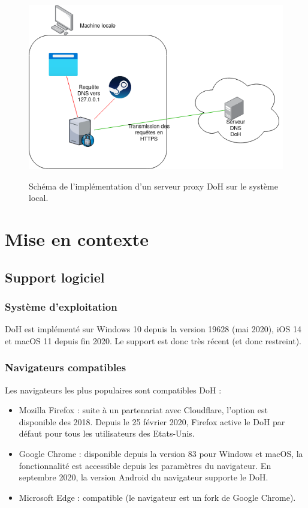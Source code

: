 \documentclass[a4paper,12pt]{article}
\begin{document}
	\begin{figure}[H]
		\begin{center}
			{\includegraphics[scale=0.6]{Images/schema_doh_proxy_local.png}}
		\end{center}
		\caption{Schéma de l'implémentation d'un serveur proxy DoH sur le système local.}
	\end{figure}

	\section{Mise en contexte}
	
	\subsection{Support logiciel}
	
	\subsubsection{Système d'exploitation}
	DoH est implémenté sur Windows 10 depuis la version 19628 (mai 2020), iOS 14 et macOS 11 depuis fin 2020. Le support est donc très récent (et donc restreint).
	\subsubsection{Navigateurs compatibles}
	Les navigateurs les plus populaires sont compatibles DoH :
	\begin{itemize}
		\item Mozilla Firefox : suite à un partenariat avec Cloudflare, l'option est disponible des 2018. Depuis le 25 février 2020, Firefox active le DoH par défaut pour tous les utilisateurs des Etats-Unis.
		\item Google Chrome : disponible depuis la version 83 pour Windows et macOS, la fonctionnalité est accessible depuis les paramètres du navigateur. En septembre 2020, la version Android du navigateur supporte le DoH.
		\item Microsoft Edge : compatible (le navigateur est un fork de Google Chrome).
	\end{itemize}
\end{document}
